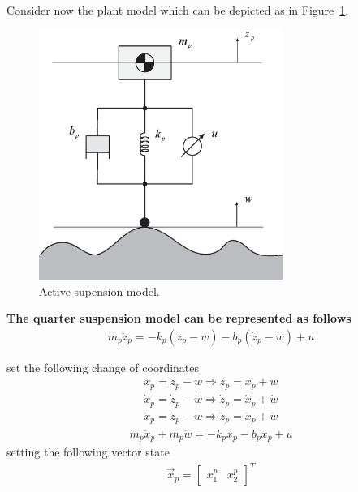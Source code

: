 \documentclass[11pt,a4paper,oneside]{book}
\numberwithin{equation}{section}
\theoremstyle{it}
\theoremstyle{definition}
\begin{document}
Consider now the plant model which can be depicted as in Figure~\ref{figModel}. 
\begin{figure}[H]
	\centering
	\includegraphics[width = 225pt, keepaspectratio]{figures/adaptive_control/active_suspension_model.eps}
	\captionsetup{width=0.75\textwidth}		
	\caption{Active supension model.}
	\label{figModel}
\end{figure}
\begin{mybox}
	\textbf{The quarter suspension model can be represented as follows}
	\begin{equation}
		\begin{aligned}
			m_p\ddot{z}_p = -k_p(z_p-w)-b_p(\dot{z}_p - \dot{w}) + u
		\end{aligned}
	\end{equation} 
\end{mybox}
set the following change of coordinates
\begin{equation*}
	\begin{aligned}
		x_p=z_p-w \Rightarrow z_p=x_p+w\\[6pt]
		\dot{x}_p=\dot{z}_p-\dot{w} \Rightarrow \dot{z}_p=\dot{x}_p+\dot{w} \\[6pt]
		\ddot{x}_p=\ddot{z}_p-\ddot{w} \Rightarrow \ddot{z}_p=\ddot{x}_p+\ddot{w}
	\end{aligned}
\end{equation*} 
\begin{equation}\label{eq_sm_1}
	\begin{aligned}
		m_p\ddot{x}_p + m_p\ddot{w}= -k_p x_p -b_p\dot{x}_p + u
	\end{aligned}
\end{equation} 
setting the following vector state
\begin{equation}
	\begin{aligned}
		\vec{x}_p = \begin{bmatrix} x_1^p & x_2^p \end{bmatrix}^T
	\end{aligned}
\end{equation} 
\end{document}
